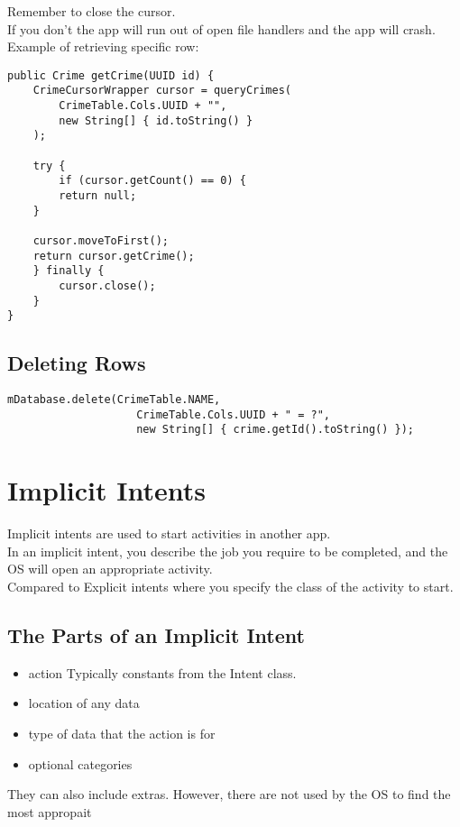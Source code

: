 \documentclass[]{article}
\begin{document}
Remember to close the cursor.
\\
If you don't the app will run out of open file handlers and the app will crash.
\\
Example of retrieving specific row:
\begin{lstlisting}
public Crime getCrime(UUID id) {
	CrimeCursorWrapper cursor = queryCrimes(
		CrimeTable.Cols.UUID + "",
		new String[] { id.toString() }
	);

	try {
		if (cursor.getCount() == 0) {
		return null;
	}

	cursor.moveToFirst();
	return cursor.getCrime();
	} finally {
		cursor.close();
	}
}
\end{lstlisting}

\subsection{Deleting Rows}
\begin{lstlisting}
mDatabase.delete(CrimeTable.NAME, 
					CrimeTable.Cols.UUID + " = ?",
					new String[] { crime.getId().toString() });
\end{lstlisting}

\section{Implicit Intents}
Implicit intents are used to start activities in another app.
\\
In an implicit intent, you describe the job you require to be completed, and the OS will open an appropriate activity.
\\
Compared to Explicit intents where you specify the class of the activity to start.
\subsection{The Parts of an Implicit Intent}
\begin{itemize}
	\item action
	\subitem Typically constants from the Intent class.
	\subitem 
	
	\item location of any data
	\item type of data that the action is for
	\item optional categories
\end{itemize}
They can also include extras.  However, there are not used by the OS to find the most appropait 
\end{document}
